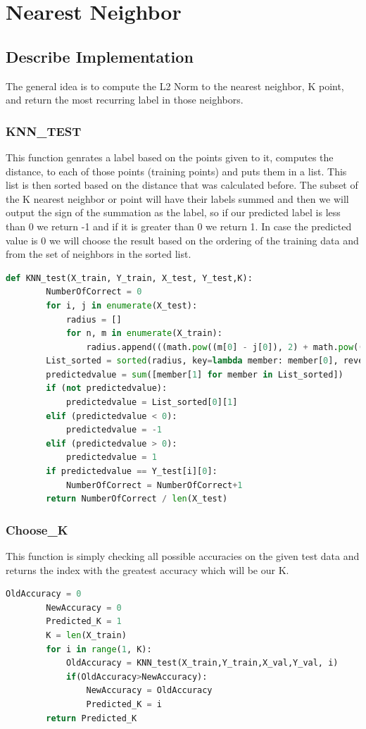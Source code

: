 \documentclass{article}
\begin{document}
	\section{Nearest Neighbor}
	\subsection{Describe Implementation}
	The general idea is to compute the L2 Norm to the nearest neighbor, K point, and return the most recurring label in those neighbors.
	
	\subsubsection{KNN\_TEST}
	This function genrates a label based on the points given to it, computes the distance, to each of those points (training points) and puts them in a list. This list is then sorted based on the distance that was calculated before. The subset of the K nearest neighbor or point will have their labels summed and then we will output the sign of the summation as the label, so if our predicted label is less than 0 we return -1 and if it is greater than 0 we return 1. In case the predicted value is 0 we will choose the result based on the ordering of the training data and from the set of neighbors in the sorted list.
	\begin{lstlisting}[language=Python]
	def KNN_test(X_train, Y_train, X_test, Y_test,K):
		NumberOfCorrect = 0
		for i, j in enumerate(X_test):
			radius = []
			for n, m in enumerate(X_train):
				radius.append(((math.pow((m[0] - j[0]), 2) + math.pow((m[1] - j[1]), 2)), Y_train[n][0]))
		List_sorted = sorted(radius, key=lambda member: member[0], reverse=False)[:K] 
		predictedvalue = sum([member[1] for member in List_sorted])
		if (not predictedvalue):
			predictedvalue = List_sorted[0][1]
		elif (predictedvalue < 0):
			predictedvalue = -1
		elif (predictedvalue > 0):
			predictedvalue = 1
		if predictedvalue == Y_test[i][0]:
			NumberOfCorrect = NumberOfCorrect+1
		return NumberOfCorrect / len(X_test)
	\end{lstlisting}
	
	\subsubsection{Choose\_K}
	This function is simply checking all possible accuracies on the given test data and returns the index with the greatest accuracy which will be our K.
	\begin{lstlisting}[language=Python]
		OldAccuracy = 0
		NewAccuracy = 0
		Predicted_K = 1
		K = len(X_train)
		for i in range(1, K):
			OldAccuracy = KNN_test(X_train,Y_train,X_val,Y_val, i)
			if(OldAccuracy>NewAccuracy):
				NewAccuracy = OldAccuracy
				Predicted_K = i
		return Predicted_K
	\end{lstlisting}
\end{document}
